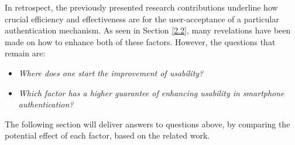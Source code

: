 In retrospect, the previously presented research contributions underline how crucial efficiency and effectiveness are for the user-acceptance of a particular authentication mechanism. As seen in Section \ref{2.2}, many revelations have been made on how to enhance both of these factors.
However, the questions that remain are: 
\begin{itemize}
\item\textit{Where does one start the improvement of usability?} 
\item\textit{Which factor has a higher guarantee of enhancing usability in smartphone authentication?} 
\end{itemize}
The following section will deliver answers to questions above, by comparing the potential effect of each factor, based on the related work. \\ 

